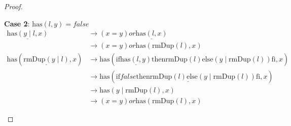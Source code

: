 \documentclass[12pt, a4paper]{article}
\newcommand{\rel}[1]{\mathrel{#1}}
\newcommand{\rmx}[1]{\mathrm{#1}}
\newcommand{\larrow}{\longrightarrow}
\newcommand{\under}{\underline}
\begin{document}
\begin{proof}
\begin{description}
\textbf{Case 2}: $\rmx{has}(l, y) = false$
\begin{align*}
\under{\rmx{has}(y \mid l, x)}
	&\larrow (x = y) \rel{or} \under{\rmx{has}(l, x)} \tag{by has2} \\
	&\larrow (x = y) \rel{or} \rmx{has}(\rmx{rmDup}(l), x) \tag{by IH} \\
\rmx{has}(\under{\rmx{rmDup}(y \mid l)}, x)
	&\larrow \rmx{has}(\rel{\rmx{if}} \under{\rmx{has}(l, y)} \rel{\rmx{then}} \rmx{rmDup}(l) \rel{\rmx{else}} (y \mid \rmx{rmDup}(l)) \rel{\rmx{fi}}, x) \tag{by rmDup2} \\
	&\larrow \rmx{has}(\under{\rel{\rmx{if}} false \rel{\rmx{then}} \rmx{rmDup}(l) \rel{\rmx{else}} (y \mid \rmx{rmDup}(l)) \rel{\rmx{fi}}}, x) \tag{by case splitting} \\
	&\larrow \rmx{has}(y \mid \rmx{rmDup}(l), x) \tag{by if2} \\
	&\larrow (x = y) \rel{or} \rmx{has}(\rmx{rmDup}(l), x) \tag{by has2}
\end{align*}
\end{description}
\end{proof}
\end{document}
